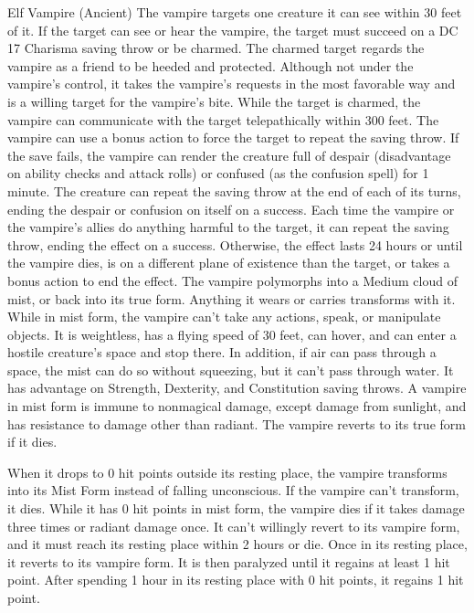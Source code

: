 \documentclass[10pt,a4paper,twoside,twocolumn,openany,bg=print,nodeprecatedcode]{dndbook}
\begin{document}
\begin{DndMonster}[float*=t]{Elf Vampire (Ancient)}
The vampire targets one creature it can see within 30 feet of it. If the target can see or hear the vampire, the target must succeed on a DC 17 Charisma saving throw or be charmed. The charmed target regards the vampire as a friend to be heeded and protected. Although not under the vampire's control, it takes the vampire's requests in the most favorable way and is a willing target for the vampire's bite.
While the target is charmed, the vampire can communicate with the target telepathically within 300 feet. The vampire can use a bonus action to force the target to repeat the saving throw. If the save fails, the vampire can render the creature full of despair (disadvantage on ability checks and attack rolls) or confused (as the confusion spell) for 1 minute. The creature can repeat the saving throw at the end of each of its turns, ending the despair or confusion on itself on a success.
Each time the vampire or the vampire's allies do anything harmful to the target, it can repeat the saving throw, ending the effect on a success. Otherwise, the effect lasts 24 hours or until the vampire dies, is on a different plane of existence than the target, or takes a bonus action to end the effect.
The vampire polymorphs into a Medium cloud of mist, or back into its true form. Anything it wears or carries transforms with it. While in mist form, the vampire can't take any actions, speak, or manipulate objects. It is weightless, has a flying speed of 30 feet, can hover, and can enter a hostile creature's space and stop there. In addition, if air can pass through a space, the mist can do so without squeezing, but it can't pass through water. It has advantage on Strength, Dexterity, and Constitution saving throws. A vampire in mist form is immune to nonmagical damage, except damage from sunlight, and has resistance to damage other than radiant. The vampire reverts to its true form if it dies.
\par
{}
When it drops to 0 hit points outside its resting place, the vampire transforms into its Mist Form instead of falling unconscious. If the vampire can't transform, it dies.
While it has 0 hit points in mist form, the vampire dies if it takes damage three times or radiant damage once. It can't willingly revert to its vampire form, and it must reach its resting place within 2 hours or die. Once in its resting place, it reverts to its vampire form. It is then paralyzed until it regains at least 1 hit point. After spending 1 hour in its resting place with 0 hit points, it regains 1 hit point.

\end{DndMonster}
\end{document}
